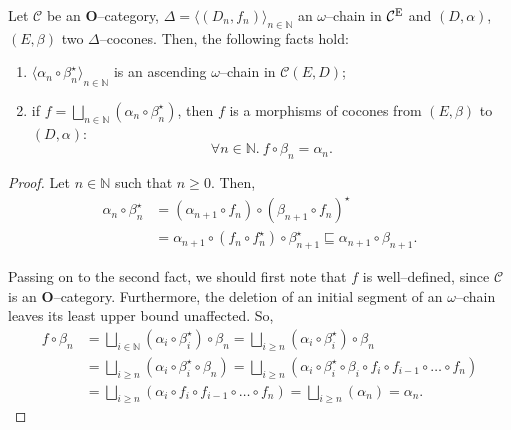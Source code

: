 \begin{lem}\label{lem:3-1}
  Let \(\mathcal{C}\) be an \(\mathbf{O}\)--category, \(\Delta = {\langle (D_n, f_n) \rangle}_{n \in \mathbb{N}}\) an \(\omega\)--chain in \(\mathcal{C}^\textup{E}\) and \((D,\alpha)\), \((E,\beta)\) two \(\Delta\)--cocones. %
  Then, the following facts hold:
  \begin{enumerate}
    \item \({\langle \alpha_n \circ \beta_n^\star \rangle}_{n \in \mathbb{N}}\) is an ascending \(\omega\)--chain in \(\mathcal{C}(E,D)\); %
    \item if \(f = \bigsqcup_{n \in \mathbb{N}}(\alpha_n \circ \beta_n^\star)\), then \(f\) is a morphisms of cocones from \((E,\beta)\) to \((D,\alpha)\):
    \begin{equation*}
      \forall n \in \mathbb{N}.\: f \circ \beta_n = \alpha_n.
    \end{equation*}
  \end{enumerate}
\end{lem}
\begin{proof}
  Let \(n \in \mathbb{N}\) such that \(n \ge 0\). Then,
  \begin{equation*}
    \begin{split}
      \alpha_n \circ \beta_n^\star &=
      (\alpha_{n+1} \circ f_n) \circ {(\beta_{n+1} \circ f_n)}^\star \\
      &= \alpha_{n+1} \circ (f_n \circ f_n^\star) \circ \beta_{n+1}^\star
      \sqsubseteq \alpha_{n+1} \circ \beta_{n+1}.
    \end{split}
  \end{equation*}

  Passing on to the second fact, we should first note that \(f\) is well--defined, since \(\mathcal{C}\) is an \(\mathbf{O}\)--category. %
  Furthermore, the deletion of an initial segment of an \(\omega\)--chain leaves its least upper bound unaffected. %
  So,
  \begin{equation*}
    \begin{split}
      f \circ \beta_n &=
      \bigsqcup_{i \in \mathbb{N}}(\alpha_i \circ \beta_i^\star) \circ \beta_n
      = \bigsqcup_{i \ge n}(\alpha_i \circ \beta_i^\star) \circ \beta_n \\
      &= \bigsqcup_{i \ge n}(\alpha_i \circ \beta_i^\star \circ \beta_n)
      = \bigsqcup_{i \ge n}(\alpha_i \circ \beta_i^\star \circ \beta_i \circ f_i \circ f_{i-1} \circ \dotsc \circ f_n) \\
      &= \bigsqcup_{i \ge n}(\alpha_i \circ f_i \circ f_{i-1} \circ \dotsc \circ f_n)
      = \bigsqcup_{i \ge n}(\alpha_n) = \alpha_n.
    \end{split}
  \end{equation*}\qedhere
\end{proof}

